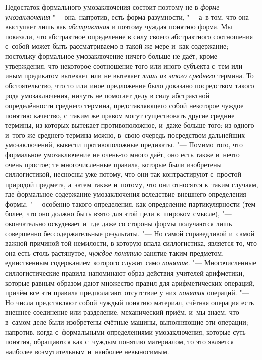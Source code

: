 Недостаток формального умозаключения состоит поэтому не в
{\em форме умозаключения}
"--- она, напротив, есть форма разумности, "--- а~в
том, что она выступает лишь как
{\em абстрактная} и
поэтому чуждая понятию форма. Мы показали, что абстрактное определение в
силу своего абстрактного соотношения с~собой может быть рассматриваемо в
такой же мере и~как содержание; постольку формальное умозаключение ничего
больше не даёт, кроме утверждения, что некоторое соотношение того или иного
субъекта с~тем или иным предикатом вытекает или не вытекает
{\em лишь из этого среднего}
термина. То обстоятельство, что то или иное предложение было
доказано посредством такого рода умозаключения, ничуть не помогает делу в
силу абстрактной определённости среднего термина, представляющего собой
некоторое чуждое понятию качество, с~таким же правом могут существовать
другие средние термины, из которых вытекает противоположное, и~даже больше
того: из одного и~того же среднего термина можно, в~свою очередь
посредством дальнейших умозаключений, вывести противоположные предикаты. "---
Помимо того, что формальное умозаключение не очень-то много
даёт, оно есть также и~нечто очень простое; те многочисленные правила,
которые были изобретены силлогистикой, несносны уже потому, что они так
контрастируют с~простой природой предмета, а~затем также и~потому, что они
относятся к~таким случаям, где формальное содержание
умозаключения вследствие внешнего определения формы, "---
особенно такого определения, как определение партикулярности
(тем более, что оно должно быть взято для этой цели в~широком смысле), "---
окончательно оскудевает и~где даже со стороны формы
получаются лишь совершенно бессодержательные результаты. "---
Но самой справедливой и~самой важной причиной той немилости,
в которую впала силлогистика, является то, что она есть столь растянутое,
{\em чуждое понятию}
занятие таким предметом, единственным содержанием которого
служит само {\em понятие}. "---
Многочисленные силлогистические правила напоминают образ
действия учителей арифметики, которые равным образом дают множество правил
для арифметических операций, причём все эти правила предполагают отсутствие
у них {\em понятия}
операций. "--- Но числа представляют собой чуждый
понятию материал, счётная операция есть внешнее соединение или разделение,
механический приём, и~мы знаем, что в~самом деле были изобретены счётные
машины, выполняющие эти операции; напротив, когда с~формальными
определениями умозаключения, которые суть понятия, обращаются как с~чуждым
понятию материалом, то это является наиболее возмутительным и~наиболее
невыносимым.

